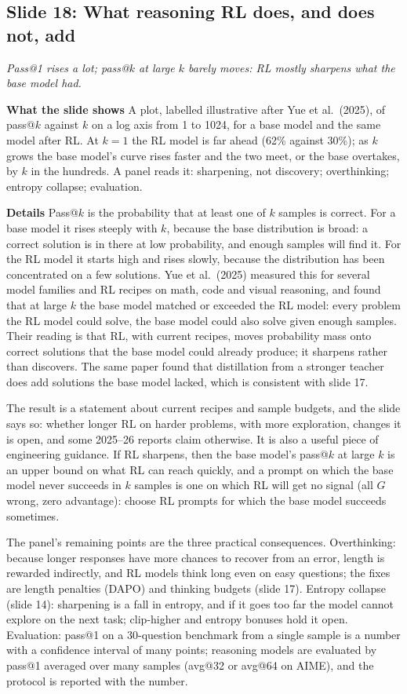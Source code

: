 \documentclass[11pt,letterpaper]{article}
\newcommand{\slide}[3]{%
  \subsection[Slide #1: #2]{Slide #1: #2}%
  {\color{muted}\itshape #3\par}\medskip}
\newcommand{\para}[1]{\medskip\noindent\textbf{#1}\quad}
\begin{document}
\slide{18}{What reasoning RL does, and does not, add}{Pass@1 rises a lot; pass@$k$ at large $k$ barely moves: RL mostly sharpens what the base model had.}

\para{What the slide shows} A plot, labelled illustrative after Yue et al.\ (2025), of pass@$k$ against $k$ on a log axis from 1 to 1024, for a base model and the same model after RL. At $k=1$ the RL model is far ahead (62\% against 30\%); as $k$ grows the base model's curve rises faster and the two meet, or the base overtakes, by $k$ in the hundreds. A panel reads it: sharpening, not discovery; overthinking; entropy collapse; evaluation.

\para{Details} Pass@$k$ is the probability that at least one of $k$ samples is correct. For a base model it rises steeply with $k$, because the base distribution is broad: a correct solution is in there at low probability, and enough samples will find it. For the RL model it starts high and rises slowly, because the distribution has been concentrated on a few solutions. Yue et al.\ (2025) measured this for several model families and RL recipes on math, code and visual reasoning, and found that at large $k$ the base model matched or exceeded the RL model: every problem the RL model could solve, the base model could also solve given enough samples. Their reading is that RL, with current recipes, moves probability mass onto correct solutions that the base model could already produce; it sharpens rather than discovers. The same paper found that distillation from a stronger teacher does add solutions the base model lacked, which is consistent with slide 17.

The result is a statement about current recipes and sample budgets, and the slide says so: whether longer RL on harder problems, with more exploration, changes it is open, and some 2025--26 reports claim otherwise. It is also a useful piece of engineering guidance. If RL sharpens, then the base model's pass@$k$ at large $k$ is an upper bound on what RL can reach quickly, and a prompt on which the base model never succeeds in $k$ samples is one on which RL will get no signal (all $G$ wrong, zero advantage): choose RL prompts for which the base model succeeds sometimes.

The panel's remaining points are the three practical consequences. Overthinking: because longer responses have more chances to recover from an error, length is rewarded indirectly, and RL models think long even on easy questions; the fixes are length penalties (DAPO) and thinking budgets (slide 17). Entropy collapse (slide 14): sharpening is a fall in entropy, and if it goes too far the model cannot explore on the next task; clip-higher and entropy bonuses hold it open. Evaluation: pass@1 on a 30-question benchmark from a single sample is a number with a confidence interval of many points; reasoning models are evaluated by pass@1 averaged over many samples (avg@32 or avg@64 on AIME), and the protocol is reported with the number.
\end{document}
